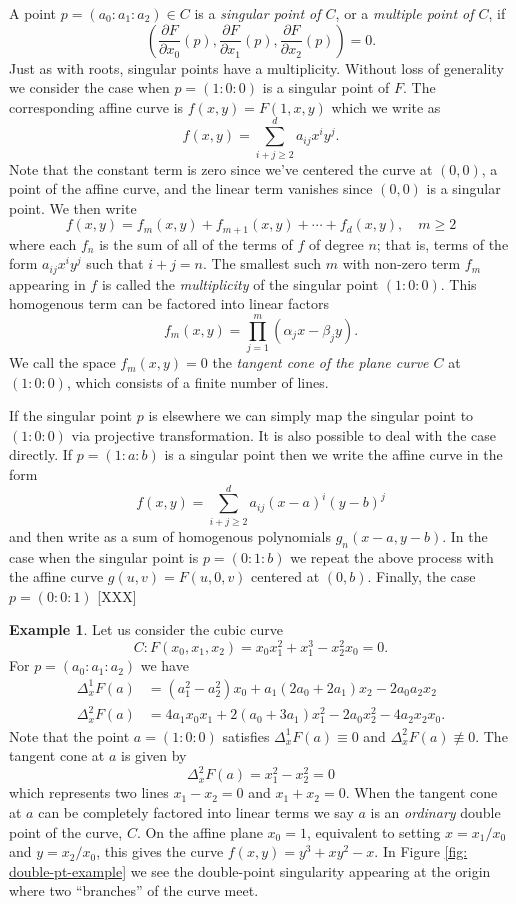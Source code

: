 \documentclass[10pt,twoside]{article}
\theoremstyle{plain}
\theoremstyle{definition}
\newtheorem{example}[theorem]{Example}
\numberwithin{equation}{section}
\begin{document}
A point $p = (a_0 : a_1 : a_2) \in C$ is a {\it singular point of $C$},
or a {\it multiple point of $C$}, if
\[
  \left(
    \frac{\partial F}{\partial x_0} (p),
    \frac{\partial F}{\partial x_1} (p),
    \frac{\partial F}{\partial x_2} (p)
  \right)
  = 0.
\]
Just as with roots, singular points have a multiplicity. Without loss of
generality we consider the case when $p = (1 : 0 : 0)$ is a singular
point of $F$. The corresponding affine curve is $f(x,y) = F(1,x,y)$
which we write as
\[
  f(x,y) = \sum_{i+j \geq 2}^d a_{ij} x^iy^j.
\]
Note that the constant term is zero since we've centered the curve at
$(0, 0)$, a point of the affine curve, and the linear term vanishes
since $(0,0)$ is a singular point. We then write
\[
  f(x,y) = f_m(x,y) + f_{m+1}(x,y) + \cdots + f_d(x,y), \quad m \geq 2
\]
where each $f_n$ is the sum of all of the terms of $f$ of degree $n$;
that is, terms of the form $a_{ij}x^iy^j$ such that $i+j=n$. The
smallest such $m$ with non-zero term $f_m$ appearing in $f$ is called
the {\it multiplicity} of the singular point $(1 : 0 : 0)$. This
homogenous term can be factored into linear factors
\[
  f_m(x,y) = \prod_{j=1}^m (\alpha_jx - \beta_jy).
\]
We call the space $f_m(x,y) = 0$ the {\it tangent cone of the plane
  curve $C$} at $(1 : 0 : 0)$, which consists of a finite number of
lines.

If the singular point $p$ is elsewhere we can simply map the singular
point to $(1 : 0 : 0)$ via projective transformation. It is also
possible to deal with the case directly. If $p = (1 : a : b)$ is a
singular point then we write the affine curve in the form
\[
    f(x,y) = \sum_{i+j \geq 2}^d a_{ij} (x-a)^i(y-b)^j
\]
and then write as a sum of homogenous polynomials $g_n(x-a,y-b)$. In the
case when the singular point is $p = (0 : 1 : b)$ we repeat the above
process with the affine curve $g(u,v) = F(u,0,v)$ centered at
$(0,b)$. Finally, the case $p = (0 : 0 : 1)$ [XXX]

\begin{example}
Let us consider the cubic curve
\[
    C: F(x_0,x_1,x_2) = x_0x_1^2 + x_1^3 - x_2^2x_0 = 0.
\]
For $p = (a_0 : a_1 : a_2)$ we have
\begin{align*}
    \Delta_x^1 F(a) &=
        (a_1^2 - a_2^2)x_0 + a_1(2a_0 + 2a_1)x_2 - 2a_0a_2x_2 \\
    \Delta_x^2 F(a) &=
        4a_1x_0x_1 + 2(a_0+3a_1)x_1^2 - 2a_0x_2^2 - 4a_2x_2x_0.
\end{align*}
Note that the point $a = (1 : 0 : 0)$ satisfies $\Delta_x^1 F(a) \equiv
0$ and $\Delta_x^2 F(a) \not \equiv 0$. The tangent cone at $a$ is given
by
\[
    \Delta_x^2 F(a) = x_1^2 - x_2^2 = 0
\]
which represents two lines $x_1 - x_2 = 0$ and $x_1 + x_2 = 0$. When the
tangent cone at $a$ can be completely factored into linear terms we say
$a$ is an {\it ordinary} double point of the curve, $C$. On the affine
plane $x_0=1$, equivalent to setting $x = x_1/x_0$ and $y=x_2/x_0$, this
gives the curve $f(x,y) = y^3 + xy^2 - x$. In Figure \ref{fig:
  double-pt-example} we see the double-point singularity appearing at
the origin where two ``branches'' of the curve meet.
\end{example}
\end{document}
